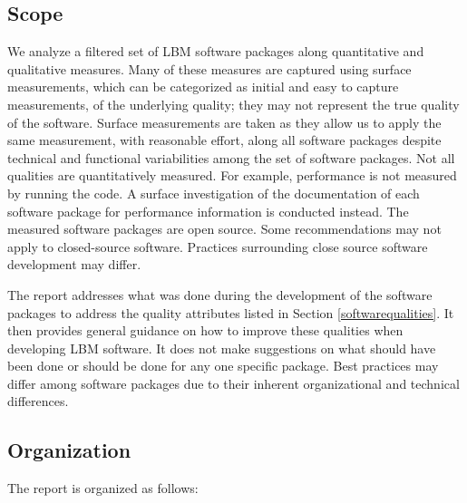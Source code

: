 \documentclass[12pt, notitlepage]{article}
\begin{document}
\subsection{Scope}

We analyze a filtered set of LBM software packages along quantitative and qualitative measures. Many of these measures are captured using surface measurements, which can be categorized as initial and easy to capture measurements, of the underlying quality; they may not represent the true quality of the software. Surface measurements are taken as they allow us to apply the same measurement, with reasonable effort, along all software packages despite technical and functional variabilities among the set of software packages. Not all qualities are quantitatively measured. For example, performance is not measured by running the code. A surface investigation of the documentation of each software package for performance information is conducted instead. The measured software packages are open source. Some recommendations may not apply to closed-source software. Practices surrounding close source software development may differ.

The report addresses what was done during the development of the software packages to address the quality attributes listed in Section \ref{softwarequalities}. It then provides general guidance on how to improve these qualities when developing LBM software. It does not make suggestions on what should have been done or should be done for any one specific package. Best practices may differ among software packages due to their inherent organizational and technical differences. 

\subsection{Organization}

The report is organized as follows:
\end{document}
